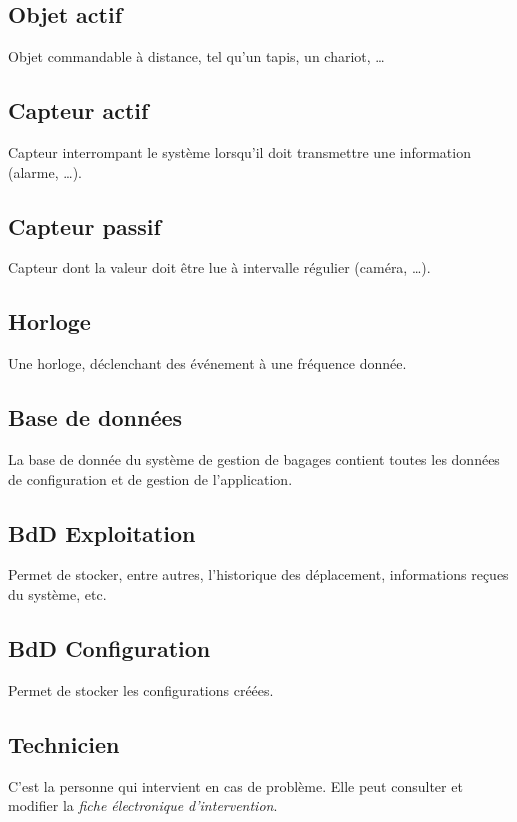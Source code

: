 \subsection{Objet actif}
Objet commandable à distance, tel qu'un tapis, un chariot, \ldots

\subsection{Capteur actif}
Capteur interrompant le système lorsqu'il doit transmettre une information (alarme, \ldots).

\subsection{Capteur passif}
Capteur dont la valeur doit être lue à intervalle régulier (caméra, \ldots).

\subsection{Horloge}
Une horloge, déclenchant des événement à une fréquence donnée.

\subsection{Base de données}
La base de donnée du système de gestion de bagages contient toutes les données de configuration et de gestion de l'application.

\subsection{BdD Exploitation}
Permet de stocker, entre autres, l'historique des déplacement, informations reçues du système, etc.

\subsection{BdD Configuration}
Permet de stocker les configurations créées.

\subsection{Technicien}
C'est la personne qui intervient en cas de problème. Elle peut consulter et modifier la \textsl{fiche électronique d'intervention}.




